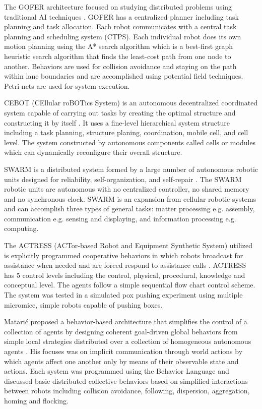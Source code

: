     The GOFER architecture focused on studying distributed problems using
      traditional AI techniques \cite{Caloud1990}.
    GOFER has a centralized planner including task planning and task allocation. 
    Each robot communicates with a central task planning and scheduling system (CTPS).
    Each individual robot does its own motion planning using the A* search 
      algorithm \cite{AI} which is a best-first graph heuristic search algorithm
      that finds the least-cost path from one node to another.
    Behaviors are used for collision avoidance and staying on the path within 
      lane boundaries and are accomplished using potential field techniques.
    Petri nets are used for system execution.

    CEBOT (CEllular roBOTics System) is an autonomous decentralized coordinated 
      system capable of carrying out tasks by creating the optimal structure 
      and constructing it by itself \cite{Fukuda1989}.
    It uses a fine-level hierarchical system structure including a task planning, 
      structure planing, coordination, mobile cell, and cell level.
    The system constructed by autonomous components called cells or modules
      which can dynamically reconfigure their overall structure.

    SWARM is a distributed system formed by a large number of autonomous
      robotic units designed for reliability, self-organization, and 
      self-repair \cite{Beni1989}.
    The SWARM robotic units are autonomous with no centralized controller,
      no shared memory and no synchronous clock.
    SWARM is an expansion from cellular robotic systems and can accomplish three 
      types of general tasks: matter processing e.g. assembly, communication 
      e.g.  sensing and displaying, and information processing e.g. computing.

    The ACTRESS (ACTor-based Robot and Equipment Synthetic System) utilized
      is explicitly programmed cooperative behaviors in which robots broadcast 
      for assistance when needed and are forced respond to assistance calls
      \cite{Asama1989}. 
    ACTRESS has 5 control levels including the control, physical,
      procedural, knowledge and conceptual level.
    The agents follow a simple sequential flow chart control scheme.
    The system was tested in a simulated pox pushing experiment using
      multiple micromice, simple robots capable of pushing boxes.

    Matari\'{c} proposed a behavior-based architecture that simplifies the 
      control of a collection of agents by designing coherent goal-driven global
      behaviors from simple local strategies distributed over a collection of 
      homogeneous autonomous agents \cite{Mataric1992}.
    His focuses was on implicit communication through world actions by which 
      agents affect one another only by means of their observable state and 
      actions.
    Each system was programmed using the Behavior Language and discussed 
      basic distributed collective behaviors based on simplified
      interactions between robots including collision avoidance, following,
      dispersion, aggregation, homing and flocking.

